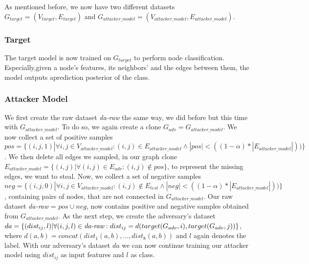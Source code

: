       As mentioned before, we now have two different datasets $G_{target} = (V_{target}, E_{target})$ and $G_{attacker\_model} = (V_{attacker\_model}, E_{attacker\_model})$.

      \subsubsection{Target}

        The target model is now trained on $G_{target}$ to perform node classification.
        Especially,given a node’s features, its neighbors’ and the edges between them, the model outputs aprediction posterior of the class.

      \subsubsection{Attacker Model}

        We first create the raw dataset \emph{da-raw} the same way, we did before but this time with $G_{attacker\_model}$.
        To do so, we again create a clone $G_{adv} = G_{attacker\_model}$.
        We now collect a set of positive samples $pos = \{(i,j, 1) | \forall i,j \in V_{attacker\_model}: (i,j) \in E_{attacker\_model} \wedge |pos| < ((1 - \alpha) * |E_{attacker\_model}|))\}$.
        We then delete all edges we sampled, in our graph clone $E_{attacker\_model} = \{(i,j) | \forall (i,j) \in E_{adv}: (i,j) \not\in pos\}$, to represent the missing edges, we want to steal.
        Now, we collect a set of negative samples $neg = \{(i,j, 0) | \forall i,j \in V_{attacker\_model}: (i,j) \not\in E_{test} \wedge |neg| < ((1 - \alpha) * |E_{attacker\_model}|))\}$, containing pairs of nodes, that are not connected in $G_{attacker\_model}$.
        Our raw dataset \emph{da-raw} = $pos \cup neg$, now contains positive and negative samples obtained from $G_{attacker\_model}$.
        As the next step, we create the adversary's dataset $da = \{(dist_{ij}, l) | \forall (i,j,l)\in\emph{da-raw}: dist_{ij} = d(target(G_{adv}, i), target(G_{adv}, j))\}$, where $d(a,b) = concat(dist_1(a,b), ..., dist_8(a,b))$ and $l$ again denotes the label.
        With our adversary's dataset $da$ we can now continue training our attacker model using $dist_{ij}$ as input features and $l$ as class.



